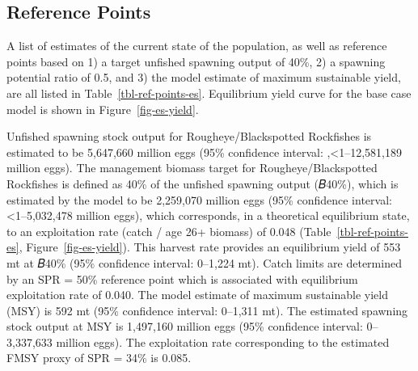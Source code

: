 \documentclass[
]{scrartcl}
\begin{document}
\subsection{Reference Points}\label{reference-points}

A list of estimates of the current state of the population, as well as
reference points based on 1) a target unfished spawning output of 40\%,
2) a spawning potential ratio of 0.5, and 3) the model estimate of
maximum sustainable yield, are all listed in
Table~\ref{tbl-ref-points-es}. Equilibrium yield curve for the base case
model is shown in Figure~\ref{fig-es-yield}.

Unfished spawning stock output for Rougheye/Blackspotted Rockfishes is
estimated to be 5,647,660 million eggs (95\% confidence interval:
,\textless1--12,581,189 million eggs). The management biomass target for
Rougheye/Blackspotted Rockfishes is defined as 40\% of the unfished
spawning output (𝐵40\%), which is estimated by the model to be 2,259,070
million eggs (95\% confidence interval: \textless1--5,032,478 million
eggs), which corresponds, in a theoretical equilibrium state, to an
exploitation rate (catch / age 26+ biomass) of 0.048
(Table~\ref{tbl-ref-points-es}, Figure~\ref{fig-es-yield}). This harvest
rate provides an equilibrium yield of 553 mt at 𝐵40\% (95\% confidence
interval: 0--1,224 mt). Catch limits are determined by an SPR = 50\%
reference point which is associated with equilibrium exploitation rate
of 0.040. The model estimate of maximum sustainable yield (MSY) is 592
mt (95\% confidence interval: 0--1,311 mt). The estimated spawning stock
output at MSY is 1,497,160 million eggs (95\% confidence interval:
0--3,337,633 million eggs). The exploitation rate corresponding to the
estimated FMSY proxy of SPR = 34\% is 0.085.

\clearpage

\begingroup
\fontsize{9.0pt}{10.8pt}\selectfont
\end{document}
